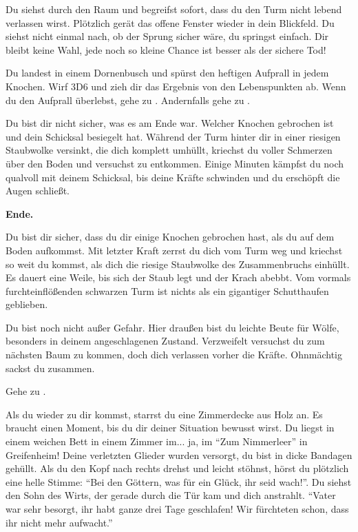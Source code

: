 Du siehst durch den Raum und begreifst sofort, dass du den Turm nicht lebend verlassen wirst. Plötzlich gerät das offene Fenster wieder in dein Blickfeld. Du siehst nicht einmal nach, ob der Sprung sicher wäre, du springst einfach. Dir bleibt keine Wahl, jede noch so kleine Chance ist besser als der sichere Tod!

Du landest in einem Dornenbusch und spürst den heftigen Aufprall in jedem Knochen. Wirf 3D6 und zieh dir das Ergebnis von den Lebenspunkten ab. Wenn du den Aufprall überlebst, gehe zu . Andernfalls gehe zu .


Du bist dir nicht sicher, was es am Ende war. Welcher Knochen gebrochen ist und dein Schicksal besiegelt hat. Während der Turm hinter dir in einer riesigen Staubwolke versinkt, die dich komplett umhüllt, kriechst du voller Schmerzen über den Boden und versuchst zu entkommen. Einige Minuten kämpfst du noch qualvoll mit deinem Schicksal, bis deine Kräfte schwinden und du erschöpft die Augen schließt.

\textbf{Ende.}


Du bist dir sicher, dass du dir einige Knochen gebrochen hast, als du auf dem Boden aufkommst. Mit letzter Kraft zerrst du dich vom Turm weg und kriechst so weit du kommst, als dich die riesige Staubwolke des Zusammenbruchs einhüllt. Es dauert eine Weile, bis sich der Staub legt und der Krach abebbt. Vom vormals furchteinflößenden schwarzen Turm ist nichts als ein gigantiger Schutthaufen geblieben.

Du bist noch nicht außer Gefahr. Hier draußen bist du leichte Beute für Wölfe, besonders in deinem angeschlagenen Zustand. Verzweifelt versuchst du zum nächsten Baum zu kommen, doch dich verlassen vorher die Kräfte. Ohnmächtig sackst du zusammen.

Gehe zu .


Als du wieder zu dir kommst, starrst du eine Zimmerdecke aus Holz an. Es braucht einen Moment, bis du dir deiner Situation bewusst wirst. Du liegst in einem weichen Bett in einem Zimmer im... ja, im ``Zum Nimmerleer'' in Greifenheim! Deine verletzten Glieder wurden versorgt, du bist in dicke Bandagen gehüllt. Als du den Kopf nach rechts drehst und leicht stöhnst, hörst du plötzlich eine helle Stimme: ``Bei den Göttern, was für ein Glück, ihr seid wach!''. Du siehst den Sohn des Wirts, der gerade durch die Tür kam und dich anstrahlt. ``Vater war sehr besorgt, ihr habt ganze drei Tage geschlafen! Wir fürchteten schon, dass ihr nicht mehr aufwacht.''

